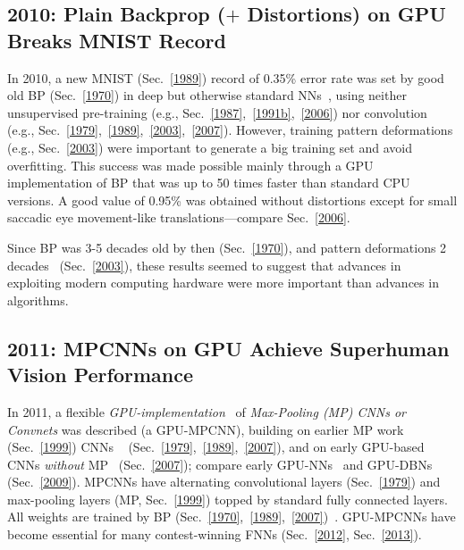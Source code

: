 \documentclass[letterpaper]{article}
\begin{document}
\begin{sloppypar}
\subsection{2010: Plain Backprop ($+$ Distortions) on GPU Breaks MNIST Record}
\label{2010}

 In 2010, a new MNIST (Sec.~\ref{1989}) record of 0.35\% error rate was set 
by good old BP (Sec.~\ref{1970}) in deep but otherwise
standard NNs~\citep{ciresan:2010}, 
using neither unsupervised pre-training 
(e.g., Sec.~\ref{1987},~\ref{1991b},~\ref{2006}) nor convolution 
(e.g., Sec.~\ref{1979},~\ref{1989},~\ref{2003},~\ref{2007}).
However,  training pattern
deformations (e.g., Sec.~\ref{2003}) were important to generate a big training set
and avoid overfitting.
This success was made possible mainly through a  GPU implementation of BP that was up to 50 times faster than standard
CPU versions. 
A good value of 0.95\% was obtained
without distortions except for small saccadic eye movement-like translations---compare
Sec.~\ref{2006}.

Since BP was 3-5 decades old by then (Sec.~\ref{1970}),
and pattern deformations 2 decades~\citep{Baird90} (Sec.~\ref{2003}),
these results seemed to suggest that
advances in exploiting modern
computing hardware were more important than advances in algorithms. 


\subsection{2011: MPCNNs on GPU Achieve Superhuman Vision Performance}
\label{2011}

In 2011, a flexible {\em GPU-implementation}~\citep{ciresan:2011ijcai}
 of {\em Max-Pooling (MP) CNNs or Convnets}  was  described (a GPU-MPCNN),
building on earlier MP work~\citep{weng1992} (Sec.~\ref{1999}) CNNs ~\citep{Fukushima:1979neocognitron,LeCun:89} (Sec.~\ref{1979},~\ref{1989},~\ref{2007}), 
and on early GPU-based CNNs {\em without} MP~\citep{chellapilla:2006b} (Sec.~\ref{2007});
compare  early GPU-NNs~\citep{gpu2004} and GPU-DBNs~\citep{raina2009large} (Sec.~\ref{2009}).
MPCNNs have alternating convolutional layers (Sec.~\ref{1979}) and max-pooling layers (MP, Sec.~\ref{1999}) topped by 
standard fully connected layers. All weights are trained by BP (Sec.~\ref{1970},~\ref{1989},~\ref{2007})~\citep{ranzato-cvpr-07,scherer:2010}.
GPU-MPCNNs have become essential for many contest-winning
FNNs (Sec.~\ref{2012}, Sec.~\ref{2013}).




\end{sloppypar}
\end{document}
